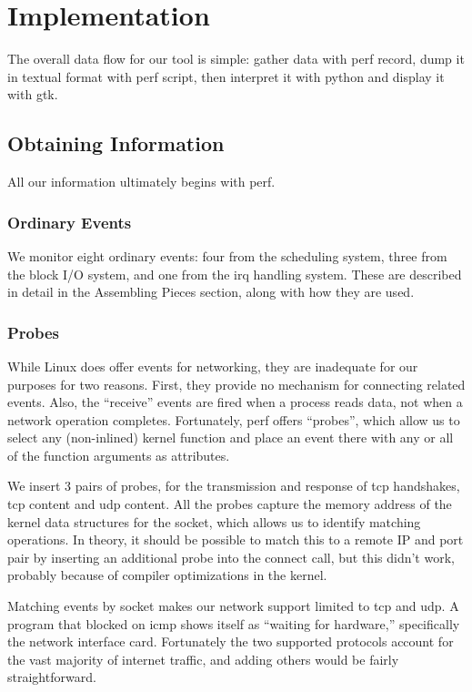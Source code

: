 \documentclass[10pt]{article}
\begin{document}
\section{Implementation}

The overall data flow for our tool is simple: gather data with perf record, dump it in textual format with perf script, then interpret it with python and display it with gtk.

\subsection{Obtaining Information}

All our information ultimately begins with perf.

\subsubsection{Ordinary Events}

We monitor eight ordinary events: four from the sched\-uling system, three from the block I/O system, and one from the irq handling system.  These are described in detail in the Assembling Pieces section, along with how they are used.

\subsubsection{Probes}

While Linux does offer events for networking, they are inadequate for our purposes for two reasons.  First, they provide no mechanism for connecting related events.  Also, the ``receive'' events are fired when a process reads data, not when a network operation completes.  Fortunately, perf offers ``probes'', which allow us to select any (non-inlined) kernel function and place an event there with any or all of the function arguments as attributes.

We insert 3 pairs of probes, for the transmission and response of tcp handshakes, tcp content and udp content.  All the probes capture the memory address of the kernel data structures for the socket, which allows us to identify matching operations.  In theory, it should be possible to match this to a remote IP and port pair by inserting an additional probe into the connect call, but this didn't work, probably because of compiler optimizations in the kernel.  

Matching events by socket makes our network support limited to tcp and udp.  A program that blocked on icmp shows itself as ``waiting for hardware,'' specifically the network interface card.  Fortunately the two supported protocols account for the vast majority of internet traffic, and adding others would be fairly straightforward.
\end{document}
